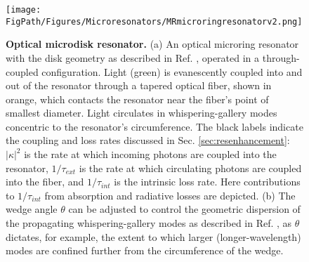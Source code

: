 \begin{figure}[htpb]
	\begin{center}
		\texttt{[image: \\FigPath/Figures/Microresonators/MRmicroringresonatorv2.png]}
	\end{center}
	\caption[Optical microdisk resonator]{\textbf{Optical microdisk resonator.} (a) An optical microring resonator with the disk geometry as described in Ref. , operated in a through-coupled configuration. Light (green) is evanescently coupled into and out of the resonator through a tapered optical fiber, shown in orange, which contacts the resonator near the fiber's point of smallest diameter. Light circulates in whispering-gallery modes concentric to the resonator's circumference. The black labels indicate the coupling and loss rates discussed in Sec. \ref{sec:resenhancement}: $|\kappa|^2$ is the rate at which incoming photons are coupled into the resonator, $1/\tau_{ext}$ is the rate at which circulating photons are coupled into the fiber, and $1/\tau_{int}$ is the intrinsic loss rate. Here contributions to $1/\tau_{int}$ from absorption and radiative losses are depicted. (b) The wedge angle $\theta$ can be adjusted to control the geometric dispersion of the propagating whispering-gallery modes as described in Ref. , as $\theta$ dictates, for example, the extent to which larger (longer-wavelength) modes are confined further from the circumference of the wedge. }
	
	\label{fig:microringresonator}
\end{figure} 


